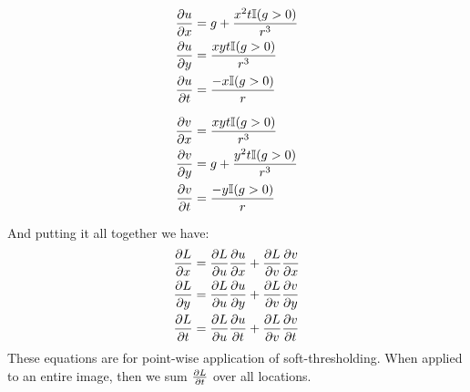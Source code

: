 \begin{minipage}{.48\linewidth}
\begin{align}
  \frac{\partial u}{\partial x} &= g + \frac{x^2t\mathbb{I}(g > 0)}{r^3} \\
  \frac{\partial u}{\partial y} &= \frac{xyt\mathbb{I}(g > 0)}{r^3} \\
  \frac{\partial u}{\partial t} &= \frac{-x\mathbb{I}(g > 0)}{r}
\end{align}
\end{minipage}
\begin{minipage}{.48\linewidth}
\begin{align}
  \frac{\partial v}{\partial x} &= \frac{xyt\mathbb{I}(g > 0)}{r^3} \\
  \frac{\partial v}{\partial y} &=g + \frac{y^2t\mathbb{I}(g > 0)}{r^3} \\
  \frac{\partial v}{\partial t} &= \frac{-y\mathbb{I}(g > 0)}{r}
\end{align}
\end{minipage}
\vspace{10pt}
And putting it all together we have:
\begin{align}
  \frac{\partial L}{\partial x} &= \frac{\partial L}{\partial u}\frac{\partial u}{\partial x} + \frac{\partial L}{\partial v}\frac{\partial v}{\partial x} \\
  \frac{\partial L}{\partial y} &= \frac{\partial L}{\partial u}\frac{\partial u}{\partial y} + \frac{\partial L}{\partial v}\frac{\partial v}{\partial y} \\
  \frac{\partial L}{\partial t} &= \frac{\partial L}{\partial u}\frac{\partial u}{\partial t} + \frac{\partial L}{\partial v}\frac{\partial v}{\partial t} 
\end{align}
These equations are for point-wise application of soft-thresholding. When
applied to an entire image, then we sum $\frac{\partial L}{\partial t}$ over all locations.
